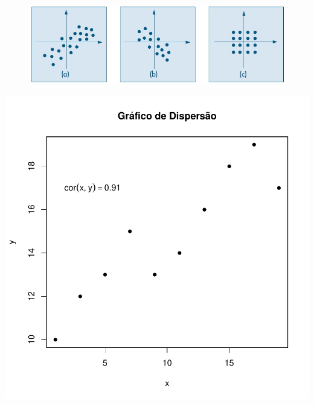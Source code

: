 \documentclass[14pt,aspectratio=1610]{beamer}
\begin{document}
\begin{frame}{}
\frametitle{}
\begin{block}{}
\begin{figure}[H]
    \centering
    \includegraphics[scale=0.5]{Figuras/correlacao}
    \caption{\cite{Morettin09}}
  \end{figure}
\end{block}
\end{frame}

\begin{frame}[fragile]{}
\begin{center}
\includegraphics{Aula3-003}
\end{center}
\end{frame}
\end{document}

